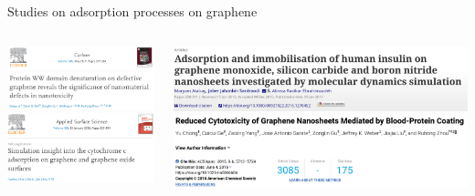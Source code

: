 \documentclass[aspectratio=169, compress]{beamer}
\begin{document}
\begin{frame}{Studies on adsorption processes on graphene}
  \begin{columns}
    \begin{column}{.4\textwidth}
      \centering
      \includegraphics[width=\textwidth]{figures/Adsorption_1} \\
      \includegraphics[width=\textwidth]{figures/Adsorption_2}
    \end{column}
    \begin{column}{.6\textwidth}
      \centering
      \includegraphics[width=\textwidth]{figures/Adsorption_3}
      \includegraphics[width=\textwidth]{figures/Adsorption_4}
    \end{column}
  \end{columns}
\end{frame}
\end{document}
